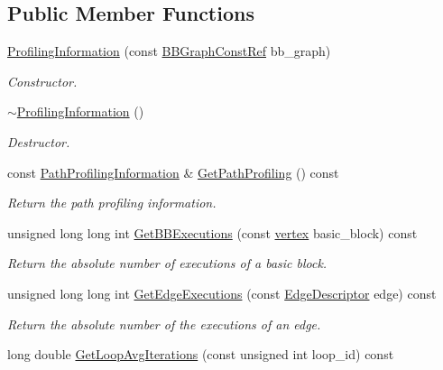 \subsection*{Public Member Functions}
\begin{DoxyCompactItemize}
\item 
\hyperlink{classProfilingInformation_a4513d68814d5f75c6461a86ced46019c}{Profiling\+Information} (const \hyperlink{basic__block_8hpp_ab66bdbde3a29e41d079d8a320af9c921}{B\+B\+Graph\+Const\+Ref} bb\+\_\+graph)
\begin{DoxyCompactList}\small\item\em Constructor. \end{DoxyCompactList}\item 
\hyperlink{classProfilingInformation_aa1a69b2ac74f607c5cd739b1d23fcc97}{$\sim$\+Profiling\+Information} ()
\begin{DoxyCompactList}\small\item\em Destructor. \end{DoxyCompactList}\item 
const \hyperlink{classPathProfilingInformation}{Path\+Profiling\+Information} \& \hyperlink{classProfilingInformation_a0842ba563f306987e4c42fc0e5ad252e}{Get\+Path\+Profiling} () const
\begin{DoxyCompactList}\small\item\em Return the path profiling information. \end{DoxyCompactList}\item 
unsigned long long int \hyperlink{classProfilingInformation_a2781e0a52b9f9d531365a5520b4af3fe}{Get\+B\+B\+Executions} (const \hyperlink{graph_8hpp_abefdcf0544e601805af44eca032cca14}{vertex} basic\+\_\+block) const
\begin{DoxyCompactList}\small\item\em Return the absolute number of executions of a basic block. \end{DoxyCompactList}\item 
unsigned long long int \hyperlink{classProfilingInformation_a4ca13cb8f2a184c1c72959737a0375fa}{Get\+Edge\+Executions} (const \hyperlink{graph_8hpp_a9eb9afea34e09f484b21f2efd263dd48}{Edge\+Descriptor} edge) const
\begin{DoxyCompactList}\small\item\em Return the absolute number of the executions of an edge. \end{DoxyCompactList}\item 
long double \hyperlink{classProfilingInformation_a6c467f30b1822b93d25212619d868377}{Get\+Loop\+Avg\+Iterations} (const unsigned int loop\+\_\+id) const

\end{DoxyCompactItemize}
